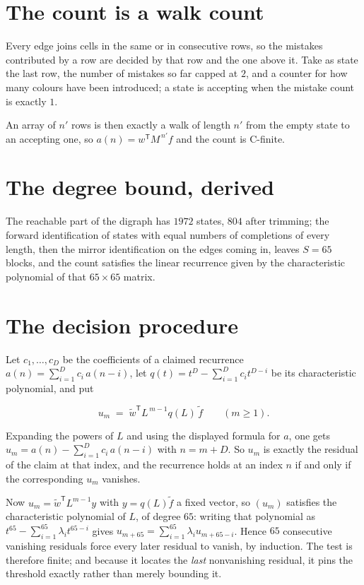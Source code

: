\documentclass[11pt]{article}
\theoremstyle{definition}
\begin{document}
\section{The count is a walk count}

Every edge joins cells in the same or in consecutive rows, so the mistakes contributed by a row are decided by that row and the one above it. Take as state the last row, the number of mistakes so far capped at $2$, and a counter for how many colours have been introduced; a state is accepting when the mistake count is exactly $1$.

An array of $n'$ rows is then exactly a walk of length $n'$ from the empty state to an accepting one, so $a(n) = w^{\mathsf T}M^{\,n'}f$ and the count is C-finite.

\section{The degree bound, derived}

The reachable part of the digraph has $1972$ states, $804$ after trimming; the forward identification of states with equal numbers of completions of every length, then the mirror identification on the edges coming in, leaves $S = 65$ blocks, and the count satisfies the linear recurrence given by the characteristic polynomial of that $65\times65$ matrix.

\section{The decision procedure}

Let $c_1,\dots,c_D$ be the coefficients of a claimed recurrence $a(n) = \sum_{i=1}^{D} c_i\,a(n-i)$, let $q(t) = t^{D} - \sum_{i=1}^{D} c_i t^{D-i}$ be its characteristic polynomial, and put

\[u_m \;=\; \tilde w^{\mathsf T} L^{\,m-1} q(L)\,\tilde f \qquad (m \ge 1).\]

Expanding the powers of $L$ and using the displayed formula for $a$, one gets $u_m = a(n) - \sum_{i=1}^{D} c_i\,a(n-i)$ with $n = m + D$. So $u_m$ is exactly the residual of the claim at that index, and the recurrence holds at an index $n$ if and only if the corresponding $u_m$ vanishes.

Now $u_m = \tilde w^{\mathsf T} L^{m-1} y$ with $y = q(L)\tilde f$ a fixed vector, so $(u_m)$ satisfies the characteristic polynomial of $L$, of degree $65$: writing that polynomial as $t^{65} - \sum_{i=1}^{65} \lambda_i t^{65-i}$ gives $u_{m+65} = \sum_{i=1}^{65} \lambda_i u_{m+65-i}$. Hence $65$ consecutive vanishing residuals force every later residual to vanish, by induction. The test is therefore finite; and because it locates the {\itshape last} nonvanishing residual, it pins the threshold exactly rather than merely bounding it.
\end{document}
